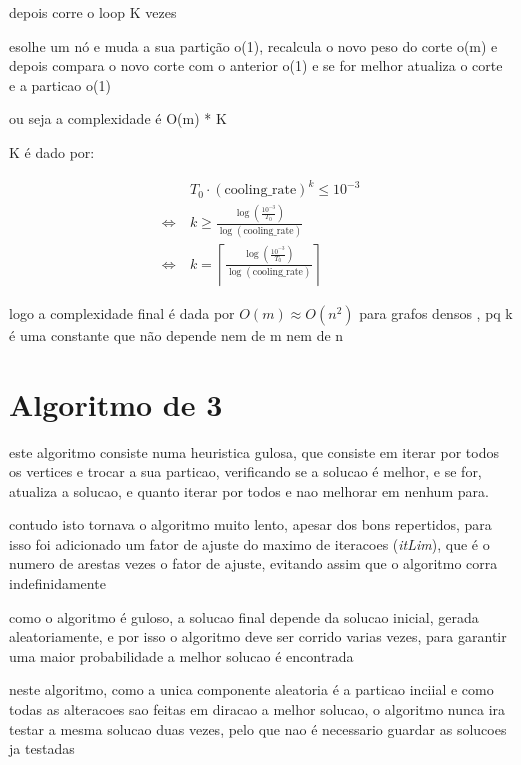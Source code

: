 \documentclass[mirror, portugues]{revdetua}
\begin{document}
depois corre o loop K vezes

esolhe um nó e muda a sua partição o(1), recalcula o novo peso do corte o(m) e depois compara o novo corte com o anterior o(1) e se for melhor atualiza o corte e a particao o(1)

ou seja a complexidade é O(m) * K

K é dado por:

\begin{align*}
    &T_0 \cdot (\text{cooling\_rate})^k \le 10^{-3} \\
    \Leftrightarrow\ &  k \geq  \frac{\log\left(\frac{10^{-3}}{T_0}\right)}{\log(\text{cooling\_rate})} \\
    \Leftrightarrow\ & k = \left\lceil \frac{\log\left(\frac{10^{-3}}{T_0}\right)}{\log(\text{cooling\_rate})} \right\rceil
\end{align*}

logo a complexidade final é dada por $O(m) \approx O(n^2)$ para grafos densos , pq k é uma constante que não depende nem de m nem de n 




\section{Algoritmo de 3}

este algoritmo consiste numa heuristica gulosa, que consiste em iterar por todos os vertices e trocar a sua particao, verificando se a solucao é melhor, e se for, atualiza a solucao, e quanto iterar por todos e nao melhorar em nenhum para.

contudo isto tornava o algoritmo muito lento, apesar dos bons repertidos, para isso foi adicionado um fator de ajuste do maximo de iteracoes (\textit{itLim}), que é o numero de arestas vezes o fator de ajuste, evitando assim que o algoritmo corra indefinidamente

como o algoritmo é guloso, a solucao final depende da solucao inicial, gerada aleatoriamente, e por isso o algoritmo deve ser corrido varias vezes, para garantir uma maior probabilidade a melhor solucao é encontrada

neste algoritmo, como a unica componente aleatoria é a particao inciial e como todas as alteracoes sao feitas em diracao a melhor solucao, o algoritmo nunca ira testar a mesma solucao duas vezes, pelo que nao é necessario guardar as solucoes ja testadas
\end{document}

